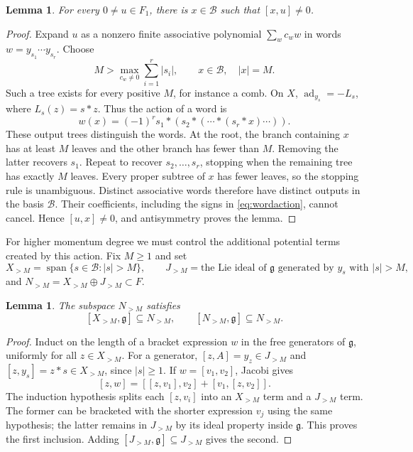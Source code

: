 \documentclass[11pt]{article}
\newtheorem{lemma}[theorem]{Lemma}
\newcommand{\g}{\mathfrak g}
\newcommand{\ad}{\operatorname{ad}}
\begin{document}
\begin{lemma}\label{lem:degreeone}
For every $0\ne u\in F_1$, there is $x\in\mathcal B$ such that
$[x,u]\ne0$.
\end{lemma}
\begin{proof}
Expand $u$ as a nonzero finite associative polynomial
$\sum_w c_w w$ in words $w=y_{s_1}\cdots y_{s_r}$.
Choose
\[
 M>\max_{c_w\ne0}\sum_{i=1}^r|s_i|,
 \qquad x\in\mathcal B,\quad |x|=M.
\]
Such a tree exists for every positive $M$, for instance a comb.
On $X$, $\ad_{y_s}=-L_s$, where $L_s(z)=s*z$. Thus the action of a word is
\begin{equation}\label{eq:wordaction}
 w(x)=(-1)^r s_1*(s_2*(\cdots*(s_r*x)\cdots)).
\end{equation}
These output trees distinguish the words. At the root, the branch containing
$x$ has at least $M$ leaves and the other branch has fewer than $M$.
Removing the latter recovers $s_1$. Repeat to recover $s_2,\ldots,s_r$, stopping
when the remaining tree has exactly $M$ leaves. Every proper subtree of $x$
has fewer leaves, so the stopping rule is unambiguous. Distinct associative
words therefore have distinct outputs in the basis $\mathcal B$.
Their coefficients, including the signs in \eqref{eq:wordaction}, cannot
cancel. Hence $[u,x]\ne0$, and antisymmetry proves the lemma.
\end{proof}

For higher momentum degree we must control the additional potential terms
created by this action. Fix $M\ge1$ and set
\[
 X_{>M}=\operatorname{span}\{s\in\mathcal B:|s|>M\},
 \qquad
 J_{>M}=\text{the Lie ideal of $\g$ generated by $y_s$ with $|s|>M$},
\]
and $N_{>M}=X_{>M}\oplus J_{>M}\subset F$.

\begin{lemma}\label{lem:stability}
The subspace $N_{>M}$ satisfies
\[
 [X_{>M},\g]\subseteq N_{>M},\qquad
 [N_{>M},\g]\subseteq N_{>M}.
\]
\end{lemma}
\begin{proof}
Induct on the length of a bracket expression $w$ in the free generators of
$\g$, uniformly for all $z\in X_{>M}$. For a generator,
$[z,A]=y_z\in J_{>M}$ and $[z,y_s]=z*s\in X_{>M}$, since $|s|\ge1$.
If $w=[v_1,v_2]$, Jacobi gives
\[
 [z,w]=[[z,v_1],v_2]+[v_1,[z,v_2]].
\]
The induction hypothesis splits each $[z,v_i]$ into an $X_{>M}$ term and a
$J_{>M}$ term. The former can be bracketed with the shorter expression $v_j$
using the same hypothesis; the latter remains in $J_{>M}$ by its ideal
property inside $\g$. This proves the first inclusion. Adding
$[J_{>M},\g]\subseteq J_{>M}$ gives the second.
\end{proof}
\end{document}
